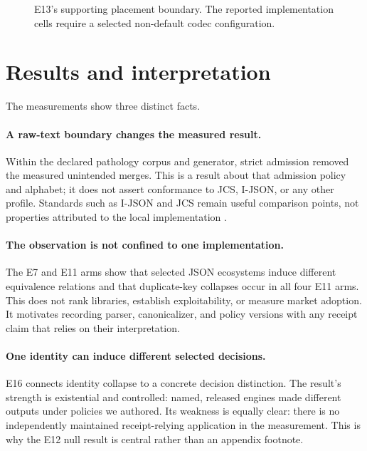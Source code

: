 \documentclass[10pt,twocolumn,letterpaper]{article}
\begin{document}
\begin{figure}[t]
  \centering
  \resizebox{\columnwidth}{!}{}
  \caption{E13's supporting placement boundary.  The reported implementation
  cells require a selected non-default codec configuration.}
  \label{fig:e13}
\end{figure}

\section{Results and interpretation}
\label{sec:results}

The measurements show three distinct facts.

\paragraph{A raw-text boundary changes the measured result.}
Within the declared pathology corpus and generator, strict admission removed
the measured unintended merges.  This is a result about that admission policy
and alphabet; it does not assert conformance to JCS, I-JSON, or any other
profile.  Standards such as I-JSON and JCS remain useful comparison points,
not properties attributed to the local implementation
\cite{rfc7493,rfc8785}.

\paragraph{The observation is not confined to one implementation.}
The E7 and E11 arms show that selected JSON ecosystems induce different
equivalence relations and that duplicate-key collapses occur in all four E11
arms.  This does not rank libraries, establish exploitability, or measure
market adoption.  It motivates recording parser, canonicalizer, and policy
versions with any receipt claim that relies on their interpretation.

\paragraph{One identity can induce different selected decisions.}
E16 connects identity collapse to a concrete decision distinction.  The
result's strength is existential and controlled: named, released engines made
different outputs under policies we authored.  Its weakness is equally clear:
there is no independently maintained receipt-relying application in the
measurement.  This is why the E12 null result is central rather than an
appendix footnote.
\end{document}
